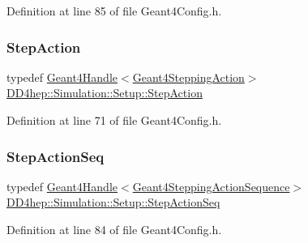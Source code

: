 Definition at line 85 of file Geant4\+Config.\+h.

\hypertarget{namespace_d_d4hep_1_1_simulation_1_1_setup_a8a860273aa78bb79db7b588476284a99}{}\label{namespace_d_d4hep_1_1_simulation_1_1_setup_a8a860273aa78bb79db7b588476284a99} 
\subsubsection{\texorpdfstring{Step\+Action}{StepAction}}
{\footnotesize\ttfamily typedef \hyperlink{class_d_d4hep_1_1_simulation_1_1_geant4_handle}{Geant4\+Handle}$<$\hyperlink{class_d_d4hep_1_1_simulation_1_1_geant4_stepping_action}{Geant4\+Stepping\+Action}$>$ \hyperlink{namespace_d_d4hep_1_1_simulation_1_1_setup_a8a860273aa78bb79db7b588476284a99}{D\+D4hep\+::\+Simulation\+::\+Setup\+::\+Step\+Action}}



Definition at line 71 of file Geant4\+Config.\+h.

\hypertarget{namespace_d_d4hep_1_1_simulation_1_1_setup_ab53ef7047293eb31171e955f62418eaf}{}\label{namespace_d_d4hep_1_1_simulation_1_1_setup_ab53ef7047293eb31171e955f62418eaf} 
\subsubsection{\texorpdfstring{Step\+Action\+Seq}{StepActionSeq}}
{\footnotesize\ttfamily typedef \hyperlink{class_d_d4hep_1_1_simulation_1_1_geant4_handle}{Geant4\+Handle}$<$\hyperlink{class_d_d4hep_1_1_simulation_1_1_geant4_stepping_action_sequence}{Geant4\+Stepping\+Action\+Sequence}$>$ \hyperlink{namespace_d_d4hep_1_1_simulation_1_1_setup_ab53ef7047293eb31171e955f62418eaf}{D\+D4hep\+::\+Simulation\+::\+Setup\+::\+Step\+Action\+Seq}}



Definition at line 84 of file Geant4\+Config.\+h.

\hypertarget{namespace_d_d4hep_1_1_simulation_1_1_setup_ab8429f4d09699162358a80f1c6d6955f}{}\label{namespace_d_d4hep_1_1_simulation_1_1_setup_ab8429f4d09699162358a80f1c6d6955f} 
